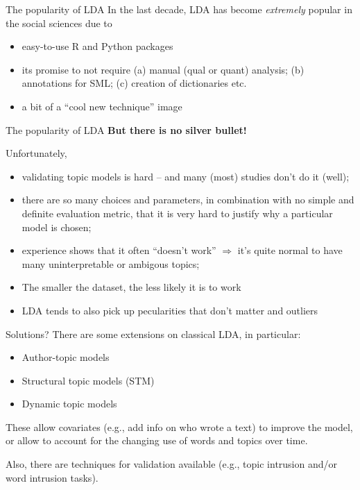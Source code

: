 \documentclass[compress]{beamer}
\begin{document}
	
	\begin{frame}{The popularity of LDA}
	In the last decade, LDA has become \emph{extremely} popular in the social sciences due to
	  \begin{itemize}
	  \item easy-to-use R and Python packages
	  \item its promise to not require (a) manual (qual or quant) analysis; (b) annotations for SML; (c) creation of dictionaries etc.
	  \item a bit of a ``cool new technique'' image
	  \end{itemize}
	\end{frame}
	
	
	\begin{frame}{The popularity of LDA}
	  \textbf{But there is no silver bullet!}
	
	  Unfortunately,
	  \begin{itemize}
	  \item validating topic models is hard -- and many (most) studies don't do it (well);
	  \item there are so many choices and parameters, in combination with no simple and definite evaluation metric, that it is very hard to justify why a particular model is chosen;
	  \item experience shows that it often ``doesn't work'' $\Rightarrow$ it's quite normal to have many uninterpretable or ambigous topics;
	  \item The smaller the dataset, the less likely it is to work
	  \item LDA tends to also pick up pecularities that don't matter and outliers
	  \end{itemize}
	\end{frame}
	
	
	\begin{frame}{Solutions?}
	There are some extensions on classical LDA, in particular:
	\begin{itemize}
	\item Author-topic models
	\item Structural topic models (STM) \parencite{Roberts2014}
	\item Dynamic topic models \parencite{Blei2006}
	\end{itemize}
	
	These allow covariates (e.g., add info on who wrote a text) to improve the model, or allow to account for the changing use of words and topics over time.
	
	Also, there are techniques for validation available (e.g., topic intrusion and/or word intrusion tasks).
	\end{frame}
	
\end{document}
